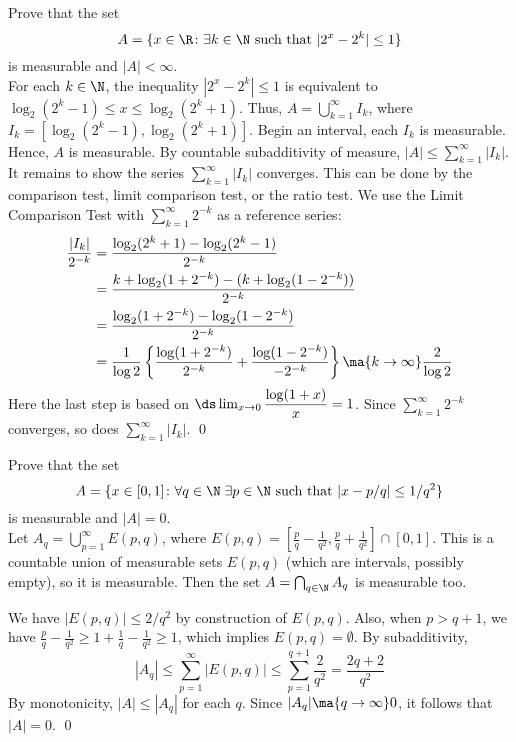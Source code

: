 \begin{hwsol} 
Prove that the set
        \[
        A = \{ x \in \R \colon \exists k \in \N \text{ such that } |2^x-2^k| \leq 1 \}
        \]
is measurable and $|A|<\infty$. \\

\pf For each $k \in \N$, the inequality $|2^x-2^k| \leq 1$ is equivalent to $\log_2(2^k-1)\leq x \leq \log_2(2^k+1)$. Thus, $A=\bigcup_{k=1}^\infty I_k$, where $I_k = [\log_2(2^k-1), \log_2(2^k+1)]$. Begin an interval, each $I_k$ is measurable. Hence, $A$ is measurable. By countable subadditivity of measure, 
$|A| \leq \sum_{k=1}^\infty |I_k|$. It remains to show the series $\sum_{k=1}^\infty |I_k|$ converges. This can be done by the comparison test, limit comparison test, or the ratio test. We use the Limit Comparison Test with $\sum_{k=1}^\infty 2^{-k}$ as a reference series:
        \[
        \begin{split}
        \dfrac{|I_k|}{2^{-k}} &= \dfrac{\log_2(2^k+1) -  \log_2(2^k-1)}{2^{-k}} \\ 
        &= \dfrac{k + \log_2(1+2^{-k}) -  (k+\log_2(1-2^{-k}))}{2^{-k}} \\ 
        &= \dfrac{\log_2(1+2^{-k}) -  \log_2(1-2^{-k})}{2^{-k}} \\ 
        &= \dfrac{1}{\log 2} \left\{ \frac{\log(1+2^{-k})}{2^{-k}} +  \frac{\log(1-2^{-k})}{-2^{-k}} \right\} \ma{k\to\infty} \frac{2}{\log 2}
        \end{split}
        \]
Here the last step is based on $\ds\lim_{x \to 0} \dfrac{\log(1+x)}{x}= 1$. Since $\sum_{k=1}^\infty 2^{-k}$ converges, so does $\sum_{k=1}^\infty |I_k|$. \qed \\
\end{hwsol}


\begin{hwsol} 
Prove that the set
        \[
        A = \{ x \in [0, 1] \colon \forall q \in \N \; \exists p \in \N \text{ such that } |x-p/q| \leq 1/q^2\}
        \]
is measurable and $|A|=0$. \\

\pf Let $A_q = \bigcup_{p=1}^\infty  E(p,q)$, where $E(p, q) = \left[\frac{p}{q} - \frac{1}{q^2}, \frac{p}{q} + \frac{1}{q^2}\right]\cap [0,1] $. This is a countable union of measurable sets $E(p, q)$ (which are intervals, possibly empty), so it is measurable. Then the set $A= \bigcap_{q \in \N} A_q$ is measurable too. 

We have $|E(p, q)| \leq 2/q^2$ by construction of $E(p, q)$. Also, when $p > q+1$, we have $\frac{p}{q} - \frac{1}{q^2} \geq 1+  \frac{1}{q}-\frac{1}{q^2} \geq 1$, which implies $E(p, q)= \emptyset$. By subadditivity,  
        \[  
        |A_q| \leq \sum_{p=1}^\infty |E(p, q)| \leq \sum_{p=1}^{q+1} \frac{2}{q^2}= \frac{2q+2}{q^2} 
         \]
By monotonicity, $|A| \leq |A_q|$ for each $q$. Since $|A_q| \ma{q \to \infty} 0$, it follows that $|A|=0$. \qed \\
\end{hwsol}


